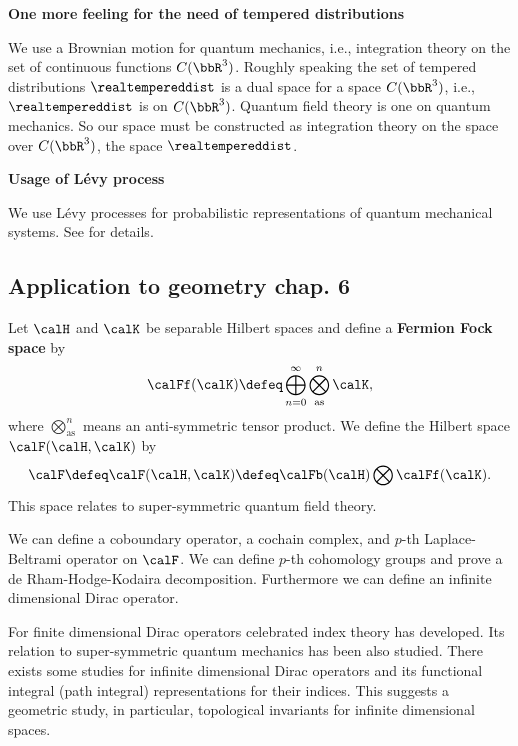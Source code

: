 \documentclass[openany, a4paper, oneside]{jsbook}
\begin{document}
\vspace{1em}

\textbf{One more feeling for the need of tempered distributions}

We use a Brownian motion for quantum mechanics, i.e.,
integration theory on the set of continuous functions $C (\bbR^3)$.
Roughly speaking the set of tempered distributions $\realtempereddist$ is a dual space for a space $C (\bbR^3)$,
i.e., $\realtempereddist$ is on $C (\bbR^3)$.
Quantum field theory is one on quantum mechanics.
So our space must be constructed as integration theory on the space over $C (\bbR^3)$, the space $\realtempereddist$.

\vspace{1em}

\textbf{Usage of L\'evy process}

We use L\'evy processes for probabilistic representations of quantum mechanical systems.
See \cite{LorincziHiroshimaBetz1} for details.
\subsection{Application to geometry \cite{AsaoArai1} chap. 6}

Let $\calH$ and $\calK$ be separable Hilbert spaces
and define a \textbf{Fermion Fock space} by
\begin{align}
 \calFf (\calK)
 \defeq
 \bigoplus_{n=0}^{\infty} \bigotimes_{\mathrm{as}}^n \calK,
\end{align}
where $\bigotimes_{\mathrm{as}}^n$ means an anti-symmetric tensor product.
We define the Hilbert space $\calF (\calH, \calK)$ by
\begin{align}
 \calF \defeq \calF (\calH, \calK) \defeq \calFb (\calH) \bigotimes \calFf (\calK).
\end{align}
This space relates to super-symmetric quantum field theory.

We can define a coboundary operator, a cochain complex,
and $p$-th Laplace-Beltrami operator on $\calF$.
We can define $p$-th cohomology groups
and prove a de Rham-Hodge-Kodaira decomposition.
Furthermore we can define an infinite dimensional Dirac operator.

For finite dimensional Dirac operators celebrated index theory has developed.
Its relation to super-symmetric quantum mechanics has been also studied.
There exists some studies for infinite dimensional Dirac operators
and its functional integral (path integral) representations
for their indices.
This suggests a geometric study, in particular, topological invariants for infinite dimensional spaces.
\end{document}
